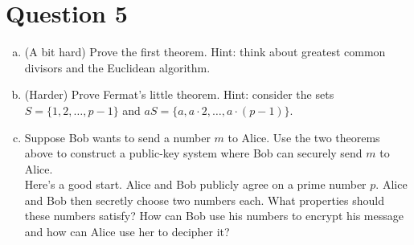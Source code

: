 \documentclass[12pt]{article}
\begin{document}
\section*{Question 5}
\begin{enumerate}[(a)]
	
	\item (A bit hard) Prove the first theorem. Hint: think about greatest common divisors and the Euclidean algorithm.
	\vspace{4cm}

	\item (Harder) Prove Fermat's little theorem. Hint: consider the sets \\$S = \{1, 2, \ldots, p-1\}$ and $aS = \{a, a\cdot 2, \ldots, a\cdot (p-1)\}$.
	

	\vspace{4cm}

	\item Suppose Bob wants to send a number $m$ to Alice. Use the two theorems above to construct a public-key system where Bob can securely send $m$ to Alice.\\

	\noindent Here's a good start. Alice and Bob publicly agree on a prime number $p$. Alice and Bob then secretly choose two numbers each. What properties should these numbers satisfy? How can Bob use his numbers to encrypt his message and how can Alice use her to decipher it?
\end{enumerate}







\end{document}
